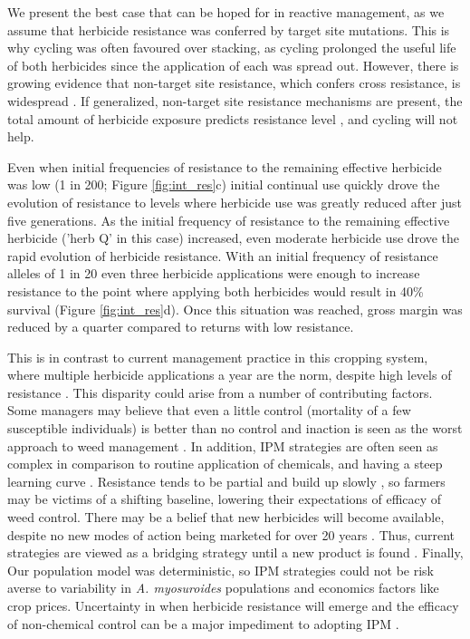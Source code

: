 \documentclass[9pt,twocolumn,twoside,lineno]{pnas-new}
\begin{document}
We present the best case that can be hoped for in reactive management, as we assume that herbicide resistance was conferred by target site mutations. This is why cycling was often favoured over stacking, as cycling prolonged the useful life of both herbicides since the application of each was spread out. However, there is growing evidence that non-target site resistance, which confers cross resistance, is widespread \citep{Hick2018}. If generalized, non-target site resistance mechanisms are present, the total amount of herbicide exposure predicts resistance level \citep{Hick2018}, and cycling will not help.

Even when initial frequencies of resistance to the remaining effective herbicide was low (1 in 200; Figure \ref{fig:int_res}c) initial continual use quickly drove the evolution of resistance to levels where herbicide use was greatly reduced after just five generations. As the initial frequency of resistance to the remaining effective herbicide ('herb Q' in this case) increased, even moderate herbicide use drove the rapid evolution of herbicide resistance. With an initial frequency of resistance alleles of 1 in 20 even three herbicide applications were enough to increase resistance to the point where applying both herbicides would result in 40\% survival (Figure \ref{fig:int_res}d). Once this situation was reached, gross margin was reduced by a quarter compared to returns with low resistance. 

This is in contrast to current management practice in this cropping system, where multiple herbicide applications a year are the norm, despite high levels of resistance \citep{Hick2018}. This disparity could arise from a number of contributing factors. Some managers may believe that even a little control (mortality of a few susceptible individuals) is better than no control and inaction is seen as the worst approach to weed management \citep{Wils2008}. In addition, IPM strategies are often seen as complex in comparison to routine application of chemicals, and having a steep learning curve \citep{Llew2006}. Resistance tends to be partial and build up slowly \citep{Moss2009, Hull2014}, so farmers may be victims of a shifting baseline, lowering their expectations of efficacy of weed control. There may be a belief that new herbicides will become available, despite no new modes of action being marketed for over 20 years \citep{Duke2012}. Thus, current strategies are viewed as a bridging strategy until a new product is found \citep{Hurl2016}. Finally, Our population model was deterministic, so IPM strategies could not be risk averse to variability in \textit{A. myosuroides} populations and economics factors like crop prices. Uncertainty in when herbicide resistance will emerge and the efficacy of non-chemical control can be a major impediment to adopting IPM \citep{Hurl2016}.     
\end{document}
